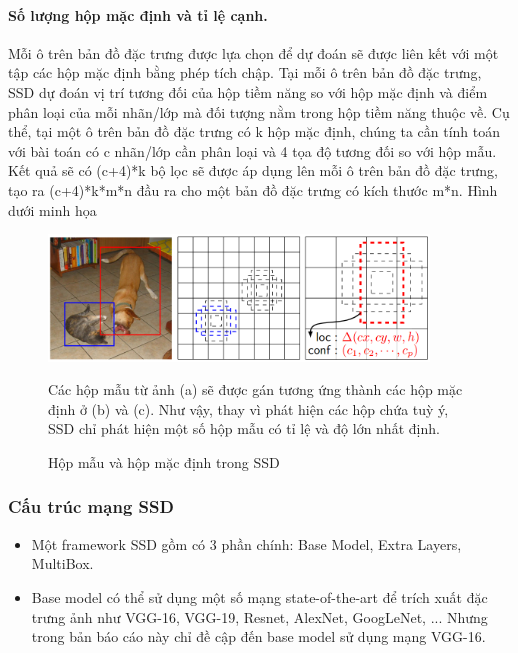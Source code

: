 \documentclass[a4paper]{report}
\begin{document}
\paragraph*{Số lượng hộp mặc định và tỉ lệ cạnh.} Mỗi ô trên bản đồ đặc trưng được lựa chọn để dự đoán sẽ được liên kết với một tập các hộp mặc định bằng phép tích chập. Tại mỗi ô trên bản đồ đặc trưng, SSD dự đoán vị trí tương đối của hộp tiềm năng so với hộp mặc định và điểm phân loại của mỗi nhãn/lớp mà đối tượng nằm trong hộp tiềm năng thuộc về. 
Cụ thể, tại một ô trên bản đồ đặc trưng có k hộp mặc định, chúng ta cần tính toán với bài toán có c nhãn/lớp cần phân loại và 4 tọa độ tương đối so với hộp mẫu. Kết quả sẽ có (c+4)*k bộ lọc sẽ được áp dụng lên mỗi ô trên bản đồ đặc trưng, tạo ra (c+4)*k*m*n đầu ra cho một bản đồ đặc trưng có kích thước m*n. Hình dưới minh họa    \\

\begin{figure}[h!]
	\centering
	\includegraphics[width=0.9\textwidth]{3_ssd_box.png}
	\caption[Caption for LOF]{Hộp mẫu và hộp mặc định trong SSD \cite{ssd}}
	Các hộp mẫu từ ảnh (a) sẽ được gán tương ứng thành các hộp mặc định ở (b) và (c). Như vậy, thay vì phát hiện các hộp chứa tuỳ ý, SSD chỉ phát hiện một số hộp mẫu có tỉ lệ và độ lớn nhất định.  
\end{figure}

\subsubsection{Cấu trúc mạng SSD}
\begin{itemize}
\item Một framework SSD gồm có 3 phần chính: Base Model, Extra Layers, MultiBox. 
\item Base model có thể sử dụng một số mạng state-of-the-art để trích xuất đặc trưng ảnh như VGG-16, VGG-19, Resnet, AlexNet, GoogLeNet, ... Nhưng trong bản báo cáo này chỉ đề cập đến base model sử dụng mạng VGG-16.
\end{itemize}
\end{document}
